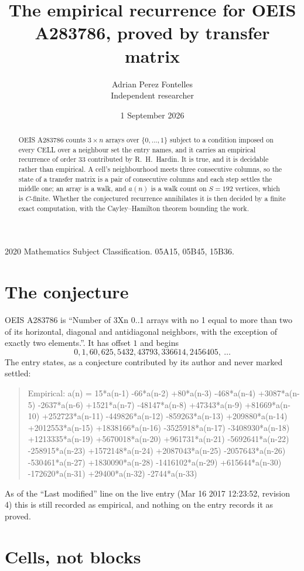 \documentclass[11pt,a4paper]{article}
\title{The empirical recurrence for OEIS A283786, proved by transfer matrix}
\author{Adrian Perez Fontelles\\ \small Independent researcher}
\date{1 September 2026}
\theoremstyle{plain}
\theoremstyle{definition}
\begin{document}
\maketitle

\begin{abstract}
OEIS A283786 counts $3\times n$ arrays over $\{0,\dots,1\}$ subject to a condition imposed on
every CELL over a neighbour set the entry names, and it carries an empirical recurrence of
order $33$ contributed by R.~H.~Hardin. It is true, and it is decidable rather than
empirical. A cell's neighbourhood meets three consecutive columns, so the state of a transfer
matrix is a pair of consecutive columns and each step settles the middle one; an array is a
walk, and $a(n)$ is a walk count on $S=192$ vertices, which is $C$-finite. Whether the
conjectured recurrence annihilates it is then decided by a finite exact computation, with the
Cayley--Hamilton theorem bounding the work.
\end{abstract}

\noindent\small 2020 Mathematics Subject Classification. 05A15, 05B45, 15B36.\normalsize

\section{The conjecture}

OEIS A283786 is ``Number of 3Xn 0..1 arrays with no 1 equal to more than two of its horizontal, diagonal and antidiagonal neighbors, with the exception of exactly two elements.''. It has offset $1$ and begins
\[
0, 1, 60, 625, 5432, 43793, 336614, 2456405,\ \dots
\]
The entry states, as a conjecture contributed by its author and never marked settled:
\begin{quote}
Empirical: a(n) = 15*a(n-1) -66*a(n-2) +80*a(n-3) -468*a(n-4) +3087*a(n-5) -2637*a(n-6) +1521*a(n-7) -48147*a(n-8) +47343*a(n-9) +81669*a(n-10) +252723*a(n-11) -449826*a(n-12) -859263*a(n-13) +209880*a(n-14) +2012553*a(n-15) +1838166*a(n-16) -3525918*a(n-17) -3408930*a(n-18) +1213335*a(n-19) +5670018*a(n-20) +961731*a(n-21) -5692641*a(n-22) -258915*a(n-23) +1572148*a(n-24) +2087043*a(n-25) -2057643*a(n-26) -530461*a(n-27) +1830090*a(n-28) -1416102*a(n-29) +615644*a(n-30) -172620*a(n-31) +29400*a(n-32) -2744*a(n-33)
\end{quote}
As of the ``Last modified'' line on the live entry (Mar 16 2017 12:23:52, revision 4) this is still
recorded as empirical, and nothing on the entry records it as proved.

\section{Cells, not blocks}
\end{document}
